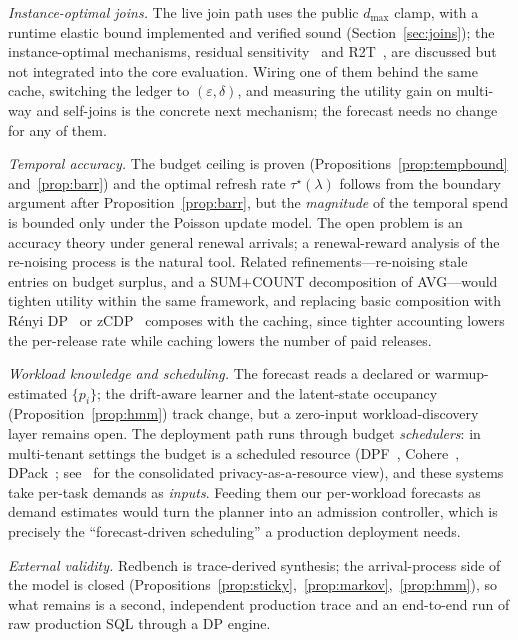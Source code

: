 \documentclass[sigconf,nonacm]{acmart}
\newcommand{\eps}{\varepsilon}
\begin{document}
\emph{Instance-optimal joins.} The live join path uses the public $d_{\max}$ clamp, with a runtime elastic bound implemented and verified sound (Section~\ref{sec:joins}); the instance-optimal mechanisms, residual sensitivity~\cite{dong2021residual} and R2T~\cite{dong2022r2t}, are discussed but not integrated into the core evaluation. Wiring one of them behind the same cache, switching the ledger to $(\eps,\delta)$, and measuring the utility gain on multi-way and self-joins is the concrete next mechanism; the forecast needs no change for any of them.

\emph{Temporal accuracy.} The budget ceiling is proven (Propositions~\ref{prop:tempbound} and~\ref{prop:barr}) and the optimal refresh rate $\tau^\star(\lambda)$ follows from the boundary argument after Proposition~\ref{prop:barr}, but the \emph{magnitude} of the temporal spend is bounded only under the Poisson update model. The open problem is an accuracy theory under general renewal arrivals; a renewal-reward analysis of the re-noising process is the natural tool. Related refinements---re-noising stale entries on budget surplus, and a SUM$+$COUNT decomposition of AVG---would tighten utility within the same framework, and replacing basic composition with R\'enyi DP~\cite{mironov2017renyi} or zCDP~\cite{bun2016concentrated} composes with the caching, since tighter accounting lowers the per-release rate while caching lowers the number of paid releases.

\emph{Workload knowledge and scheduling.} The forecast reads a declared or warmup-estimated $\{p_i\}$; the drift-aware learner and the latent-state occupancy (Proposition~\ref{prop:hmm}) track change, but a zero-input workload-discovery layer remains open. The deployment path runs through budget \emph{schedulers}: in multi-tenant settings the budget is a scheduled resource (DPF~\cite{luo2021dpf}, Cohere~\cite{kuchler2024cohere}, DPack~\cite{tholoniat2025dpack}; see~\cite{tholoniat2025thesis} for the consolidated privacy-as-a-resource view), and these systems take per-task demands as \emph{inputs}. Feeding them our per-workload forecasts as demand estimates would turn the planner into an admission controller, which is precisely the ``forecast-driven scheduling'' a production deployment needs.

\emph{External validity.} Redbench is trace-derived synthesis; the arrival-process side of the model is closed (Propositions~\ref{prop:sticky},~\ref{prop:markov},~\ref{prop:hmm}), so what remains is a second, independent production trace and an end-to-end run of raw production SQL through a DP engine.
\end{document}
